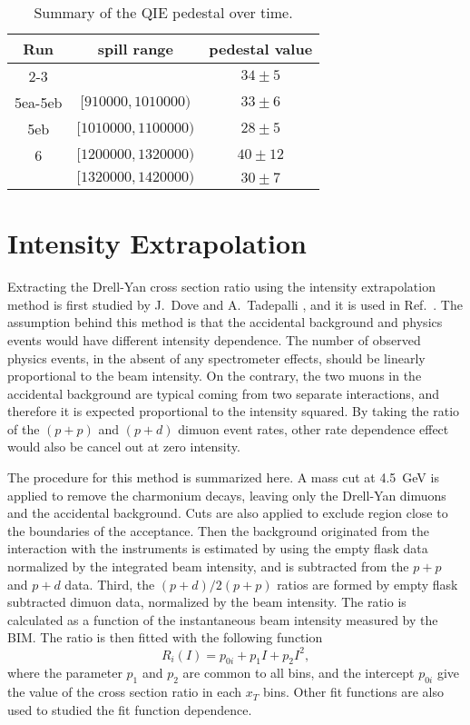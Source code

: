 \documentclass[../main.tex]{subfiles}
\begin{document}
\begin{table}[h!]
	\centering
	\caption{Summary of the QIE pedestal over time\cite{kenichi-9289}.}
	\label{tabel:pedestal}
	\begin{tabular}{|c|c|c|}
		\hline
		Run     & spill range                     & pedestal value \\ \hline
		2-3     &                                 & $34\pm5$       \\ \hline
		5ea-5eb & $[\num{910000},\num{1010000})$  & $33\pm 6$      \\ \hline
		5eb     & $[\num{1010000},\num{1100000})$ & $28\pm 5$      \\ \hline
		6       & $[\num{1200000},\num{1320000})$ & $40\pm 12$     \\ \cline{2-3}
		        & $[\num{1320000},\num{1420000})$ & $30\pm 7$      \\ \hline
	\end{tabular}
\end{table}

\section{Intensity Extrapolation}
\label{sec:extrapolation}
Extracting the Drell-Yan cross section ratio using the intensity extrapolation method
is first studied by J.~Dove \cite{dove2020} and A.~Tadepalli \cite{tadepalli2019},
and it is used in Ref.~\cite{dove2021}.
The assumption behind this method is that the accidental background and physics events
would have different intensity dependence. The number of observed physics
events, in the absent of any spectrometer effects, should be linearly proportional to the beam
intensity. On the contrary, the two muons in the accidental background are typical coming from
two separate interactions, and therefore it is expected proportional to the intensity squared.
By taking the ratio of the $(p+p)$ and $(p+d)$ dimuon event rates,
other rate dependence effect would also be cancel out at zero intensity.

The procedure for this method is summarized here. A mass cut at \SI{4.5}{\GeV} is applied to
remove the charmonium decays, leaving only the Drell-Yan dimuons and the accidental background.
Cuts are also applied to exclude region close to the boundaries of the acceptance.
Then the background originated from the interaction with the instruments is estimated by using
the empty flask data normalized by the integrated beam intensity, and is subtracted from the
$p+p$ and $p+d$ data. Third, the $(p+d)/2(p+p)$ ratios are formed by empty flask subtracted
dimuon data, normalized by the beam intensity. The ratio is calculated as a function of the
instantaneous beam intensity measured by the BIM. The ratio is then fitted with the following function
\begin{equation}
	R_i \left(I\right) = p_{0i} + p_1 I + p_2 I^2,
	\label{eq:common_pol2}
\end{equation}
where the parameter $p_1$ and $p_2$ are common to all bins, and the intercept $p_{0i}$ give
the value of the cross section ratio in each $x_T$ bins. Other fit functions are also used
to studied the fit function dependence.
\end{document}
